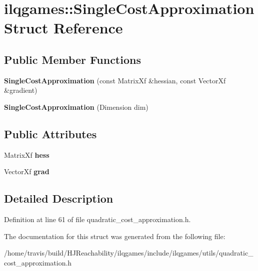 \hypertarget{structilqgames_1_1_single_cost_approximation}{}\section{ilqgames\+:\+:Single\+Cost\+Approximation Struct Reference}
\label{structilqgames_1_1_single_cost_approximation}
\subsection*{Public Member Functions}
\begin{DoxyCompactItemize}
\item 
{\bfseries Single\+Cost\+Approximation} (const Matrix\+Xf \&hessian, const Vector\+Xf \&gradient)\hypertarget{structilqgames_1_1_single_cost_approximation_a33cb225c90ccecd41aeb0bb21e6f8205}{}\label{structilqgames_1_1_single_cost_approximation_a33cb225c90ccecd41aeb0bb21e6f8205}

\item 
{\bfseries Single\+Cost\+Approximation} (Dimension dim)\hypertarget{structilqgames_1_1_single_cost_approximation_a52fbf9287b766545b8efcddf7518f683}{}\label{structilqgames_1_1_single_cost_approximation_a52fbf9287b766545b8efcddf7518f683}

\end{DoxyCompactItemize}
\subsection*{Public Attributes}
\begin{DoxyCompactItemize}
\item 
Matrix\+Xf {\bfseries hess}\hypertarget{structilqgames_1_1_single_cost_approximation_aa450efcc9c0b0c13fa59f4d8b237b5a5}{}\label{structilqgames_1_1_single_cost_approximation_aa450efcc9c0b0c13fa59f4d8b237b5a5}

\item 
Vector\+Xf {\bfseries grad}\hypertarget{structilqgames_1_1_single_cost_approximation_adc376709ff1a00a82eb713e9c56fb4e8}{}\label{structilqgames_1_1_single_cost_approximation_adc376709ff1a00a82eb713e9c56fb4e8}

\end{DoxyCompactItemize}


\subsection{Detailed Description}


Definition at line 61 of file quadratic\+\_\+cost\+\_\+approximation.\+h.



The documentation for this struct was generated from the following file\+:\begin{DoxyCompactItemize}
\item 
/home/travis/build/\+H\+J\+Reachability/ilqgames/include/ilqgames/utils/quadratic\+\_\+cost\+\_\+approximation.\+h\end{DoxyCompactItemize}
